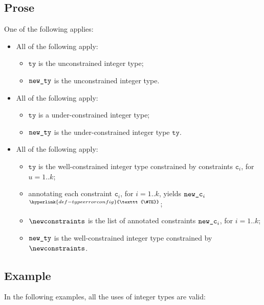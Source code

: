 \documentclass{book}
\newcommand\TypeErrorConfig[0]{\hyperlink{def-typeerrorconfig}{\texttt{\#TE}}}
\newcommand\ProseOrTypeError[0]{\hyperlink{def-proseortypeerror}{$^{\TypeErrorConfig}$}}
\newcommand\vc[0]{\texttt{c}}
\newcommand\tty[0]{\texttt{ty}}
\begin{document}
\subsection{Prose}
One of the following applies:
\begin{itemize}
  \item All of the following apply:
    \begin{itemize}
      \item $\tty$ is the unconstrained integer type;
      \item $\texttt{new\_ty}$ is the unconstrained integer type.
    \end{itemize}
  \item All of the following apply:
    \begin{itemize}
      \item $\tty$ is a under-constrained integer type;
      \item $\texttt{new\_ty}$ is the under-constrained integer type $\tty$.
    \end{itemize}
  \item All of the following apply:
    \begin{itemize}
      \item $\tty$ is the well-constrained integer type constrained by
        constraints $\vc_i$, for $u=1..k$;
      \item annotating each constraint $\vc_i$, for $i=1..k$,
      yields $\texttt{new\_c}_i$ \ProseOrTypeError;
      \item $\newconstraints$ is the list of annotated constraints $\texttt{new\_c}_i$,
      for $i=1..k$;
      \item $\texttt{new\_ty}$ is the well-constrained integer type constrained
        by $\newconstraints$.
    \end{itemize}
\end{itemize}

\subsection{Example}

In the following examples, all the uses of integer types are valid:

\end{document}
